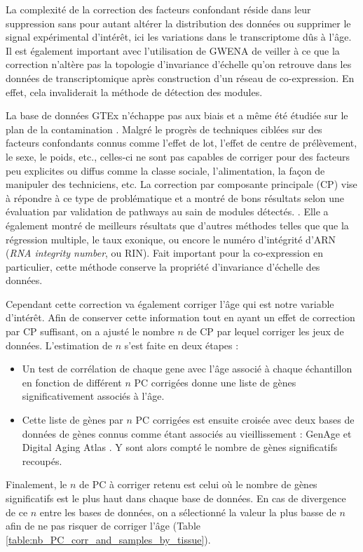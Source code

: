 La complexité de la correction des facteurs confondant réside dans leur suppression sans pour autant altérer la distribution des données ou supprimer le signal expérimental d'intérêt, ici les variations dans le transcriptome dûs à l'âge. Il est également important avec l'utilisation de GWENA de veiller à ce que la correction n'altère pas la topologie d'invariance d'échelle qu'on retrouve dans les données de transcriptomique après construction d'un réseau de co-expression. En effet, cela invaliderait la méthode de détection des modules.

La base de données GTEx n'échappe pas aux biais et a même été étudiée sur le plan de la contamination \cite{Nieuwenhuis2020}.
Malgré le progrès de techniques ciblées sur des facteurs confondants connus comme l'effet de lot, l'effet de centre de prélèvement, le sexe, le poids, etc., celles-ci ne sont pas capables de corriger pour des facteurs peu explicites ou diffus comme la classe sociale, l'alimentation, la façon de manipuler des techniciens, etc. La correction par composante principale (CP) vise à répondre à ce type de problématique et a montré de bons résultats selon une évaluation par validation de pathways au sain de modules détectés. \cite{Parsana2019}. Elle a également montré de meilleurs résultats que d'autres méthodes telles que que la régression multiple, le taux exonique, ou encore le numéro d'intégrité d'ARN (\textit{RNA integrity number}, ou RIN). Fait important pour la co-expression en particulier, cette méthode conserve la propriété d'invariance d'échelle des données.

Cependant cette correction va également corriger l'âge qui est notre variable d'intérêt. Afin de conserver cette information tout en ayant un effet de correction par CP suffisant, on a ajusté le nombre $n$ de CP par lequel corriger les jeux de données. L'estimation de $n$ s'est faite en deux étapes :
\begin{itemize}
    \item Un test de corrélation de chaque gene avec l'âge associé à chaque échantillon en fonction de différent $n$ PC corrigées donne une liste de gènes significativement associés à l'âge.
    \item Cette liste de gènes par $n$ PC corrigées est ensuite croisée avec deux bases de données de gènes connus comme étant associés au vieillissement : GenAge \cite{DeMagalhaes2004} et Digital Aging Atlas \cite{Craig2015}. Y sont alors compté le nombre de gènes significatifs recoupés.
\end{itemize}
Finalement, le $n$ de PC à corriger retenu est celui où le nombre de gènes significatifs est le plus haut dans chaque base de données. En cas de divergence de ce $n$ entre les bases de données, on a sélectionné la valeur la plus basse de $n$ afin de ne pas risquer de corriger l'âge (Table \ref{table:nb_PC_corr_and_samples_by_tissue}).


